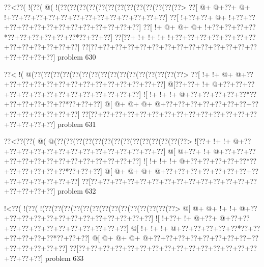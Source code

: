 \vbox{\vbox{\goo
\0??<\0??(\- !(\0??(\- @(\- !(\0??(\0??(\0??(\0??(\0??(\0??(\0??(\0??(\0??(\0??(\0??(\0??(\0??>
\0??[\- @+\- @+\0??+\- @+\- !+\0??+\0??+\0??+\0??+\0??+\0??+\0??+\0??+\0??+\0??+\0??+\0??+\0??]
\0??[\- !+\0??+\0??+\- @+\- !+\0??+\0??+\0??+\0??+\0??+\0??+\0??+\0??+\0??+\0??+\0??+\0??+\0??]
\0??[\- !+\- @+\- @+\- @+\- !+\0??+\0??+\0??+\0??*\0??+\0??+\0??+\0??+\0??+\0??*\0??+\0??+\0??]
\0??[\0??+\- !+\- !+\- !+\- !+\0??+\0??+\0??+\0??+\0??+\0??+\0??+\0??+\0??+\0??+\0??+\0??+\0??]
\0??[\0??+\0??+\0??+\0??+\0??+\0??+\0??+\0??+\0??+\0??+\0??+\0??+\0??+\0??+\0??+\0??+\0??+\0??]
}
\hfil problem 630\hfil\break
}



\vbox{\vbox{\goo
\0??<\- !(\- @(\0??(\0??(\0??(\0??(\0??(\0??(\0??(\0??(\0??(\0??(\0??(\0??(\0??(\0??(\0??(\0??>
\0??[\- !+\- !+\- @+\- @+\0??+\0??+\0??+\0??+\0??+\0??+\0??+\0??+\0??+\0??+\0??+\0??+\0??+\0??]
\- @[\0??+\0??+\- !+\- @+\0??+\0??+\0??+\0??+\0??+\0??+\0??+\0??+\0??+\0??+\0??+\0??+\0??+\0??]
\- ![\- !+\- !+\- !+\- @+\0??+\0??+\0??+\0??+\0??*\0??+\0??+\0??+\0??+\0??+\0??*\0??+\0??+\0??]
\- @[\- @+\- @+\- @+\- @+\0??+\0??+\0??+\0??+\0??+\0??+\0??+\0??+\0??+\0??+\0??+\0??+\0??+\0??]
\0??[\0??+\0??+\0??+\0??+\0??+\0??+\0??+\0??+\0??+\0??+\0??+\0??+\0??+\0??+\0??+\0??+\0??+\0??]
}
\hfil problem 631\hfil\break
}



\vbox{\vbox{\goo
\0??<\0??(\0??(\- @(\- @(\0??(\0??(\0??(\0??(\0??(\0??(\0??(\0??(\0??(\0??(\0??(\0??(\0??(\0??>
\- ![\0??+\- !+\- !+\- @+\0??+\0??+\0??+\0??+\0??+\0??+\0??+\0??+\0??+\0??+\0??+\0??+\0??+\0??]
\- @[\- @+\0??+\- !+\- @+\0??+\0??+\0??+\0??+\0??+\0??+\0??+\0??+\0??+\0??+\0??+\0??+\0??+\0??]
\- ![\- !+\- !+\- !+\- @+\0??+\0??+\0??+\0??+\0??*\0??+\0??+\0??+\0??+\0??+\0??*\0??+\0??+\0??]
\- @[\- @+\- @+\- @+\- @+\0??+\0??+\0??+\0??+\0??+\0??+\0??+\0??+\0??+\0??+\0??+\0??+\0??+\0??]
\0??[\0??+\0??+\0??+\0??+\0??+\0??+\0??+\0??+\0??+\0??+\0??+\0??+\0??+\0??+\0??+\0??+\0??+\0??]
}
\hfil problem 632\hfil\break
}



\vbox{\vbox{\goo
\- !<\0??(\- !(\0??(\- !(\0??(\0??(\0??(\0??(\0??(\0??(\0??(\0??(\0??(\0??(\0??(\0??(\0??(\0??>
\- @[\- @+\- @+\- !+\- !+\- @+\0??+\0??+\0??+\0??+\0??+\0??+\0??+\0??+\0??+\0??+\0??+\0??+\0??]
\- ![\- !+\0??+\- !+\- @+\0??+\- @+\0??+\0??+\0??+\0??+\0??+\0??+\0??+\0??+\0??+\0??+\0??+\0??]
\- @[\- !+\- !+\- !+\- @+\0??+\0??+\0??+\0??+\0??*\0??+\0??+\0??+\0??+\0??+\0??*\0??+\0??+\0??]
\- @[\- @+\- @+\- @+\- @+\0??+\0??+\0??+\0??+\0??+\0??+\0??+\0??+\0??+\0??+\0??+\0??+\0??+\0??]
\0??[\0??+\0??+\0??+\0??+\0??+\0??+\0??+\0??+\0??+\0??+\0??+\0??+\0??+\0??+\0??+\0??+\0??+\0??]
}
\hfil problem 633\hfil\break
}



